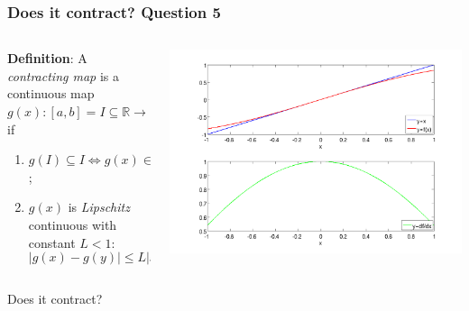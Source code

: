 \documentclass{beamer}
\begin{document}
\begin{frame}
\frametitle{Does it contract? Question 5}

\begin{columns}
    \begin{column}{0.45\textwidth}
  {\bf Definition}: A \emph{contracting map} is a continuous map
  $g(x) : [a, b] = I \subseteq \mathbb{R} \rightarrow \mathbb{R}$ if
\begin{enumerate}
  \item $g(I) \subseteq I \Leftrightarrow g(x) \in I \, \, \, \forall
    x \in I$;
  \item $g(x)$ is \emph{Lipschitz} continuous with constant $L < 1$:
    \begin{equation*}
      | g(x) - g(y) | \leq L | x - y | \, \, \, \forall x, y \in I.
    \end{equation*}
  \end{enumerate}
\end{column}
\begin{column}{0.55\textwidth}
  \begin{center}
   \includegraphics[width=\textwidth]{figures/cmap2}
  \end{center}
\end{column}
\end{columns}
\begin{overlayarea}{\textwidth}{0.1\textheight}
Does it contract?
\end{overlayarea}
\end{frame}
\end{document}
